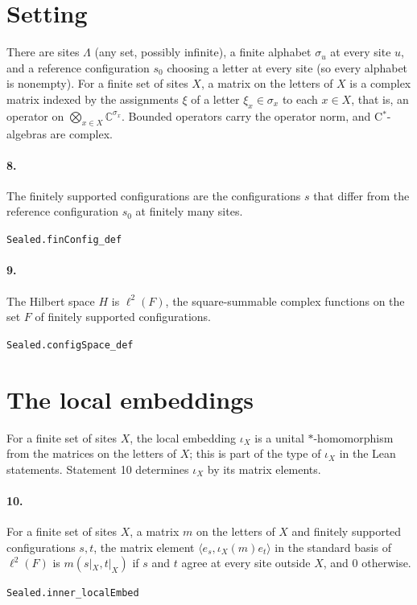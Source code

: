 \documentclass[11pt]{article}
\begin{document}
\section*{Setting}
There are sites $\Lambda$ (any set, possibly infinite), a finite alphabet $\sigma_u$ at every site $u$, and a reference configuration $s_0$ choosing a letter at every site (so every alphabet is nonempty). For a finite set of sites $X$, a matrix on the letters of $X$ is a complex matrix indexed by the assignments $\xi$ of a letter $\xi_x \in \sigma_x$ to each $x \in X$, that is, an operator on $\bigotimes_{x \in X} \mathbb C^{\sigma_x}$. Bounded operators carry the operator norm, and C$^*$-algebras are complex.

\paragraph{8.} The finitely supported configurations are the configurations $s$ that differ from the reference configuration $s_0$ at finitely many sites.\par{\footnotesize\texttt{Sealed.finConfig\_def}}

\paragraph{9.} The Hilbert space $H$ is $\ell^2(F)$, the square-summable complex functions on the set $F$ of finitely supported configurations.\par{\footnotesize\texttt{Sealed.configSpace\_def}}

\section*{The local embeddings}
For a finite set of sites $X$, the local embedding $\iota_X$ is a unital $*$-homomorphism from the matrices on the letters of $X$; this is part of the type of $\iota_X$ in the Lean statements. Statement 10 determines $\iota_X$ by its matrix elements.

\paragraph{10.} For a finite set of sites $X$, a matrix $m$ on the letters of $X$ and finitely supported configurations $s, t$, the matrix element $\langle e_s, \iota_X(m) e_t\rangle$ in the standard basis of $\ell^2(F)$ is $m(s|_X, t|_X)$ if $s$ and $t$ agree at every site outside $X$, and $0$ otherwise.\par{\footnotesize\texttt{Sealed.inner\_localEmbed}}
\end{document}
